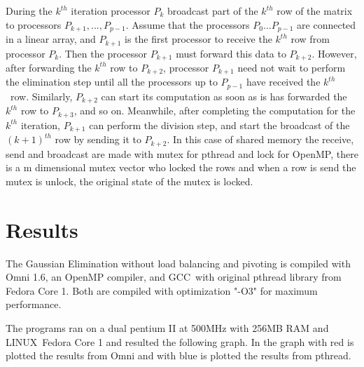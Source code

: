 \documentclass[a4paper]{article}
\begin{document}
During the $k^{th}$ iteration processor $P_{k}$ broadcast part of the $%
k^{th} $ row of the matrix to processors $P_{k+1},...,P_{p-1}$. Assume that
the processors $P_{0}...P_{p-1}$ are connected in a linear array, and $%
P_{k+1}$ is the first processor to receive the $k^{th}$ row from processor $%
P_{k}$. Then the processor $P_{k+1}$ must forward this data to $P_{k+2}$.
However, after forwarding the $k^{th}$ row to $P_{k+2}$, processor $P_{k+1}$
need not wait to perform the elimination step until all the processors up to 
$P_{p-1}$ have received the $k^{th}\,$\ row. Similarly, $P_{k+2}$ can start
its computation as soon as is has forwarded the $k^{th}$ row to $P_{k+3}$,
and so on. Meanwhile, after completing the computation for the $k^{th}$
iteration, $P_{k+1}$ can perform the division step, and start the broadcast
of the $(k+1)^{th}$ row by sending it to $P_{k+2}$. In this case of shared
memory the receive, send and broadcast are made with mutex for pthread and
lock for OpenMP, there is a m dimensional mutex vector who locked the rows
and when a row is send the mutex is unlock, the original state of the mutex
is locked.

\section{Results}

The Gaussian Elimination without load balancing and pivoting is compiled
with Omni 1.6, an OpenMP compiler, and GCC\ with original pthread library
from Fedora Core 1. Both are compiled with optimization "-O3" for maximum
performance.

The programs ran on a dual pentium II at 500MHz with 256MB RAM and LINUX\
Fedora Core 1 and resulted the following graph. In the graph with red is
plotted the results from Omni and with blue is plotted the results from
pthread.

\begin{center}
\end{center}
\end{document}
